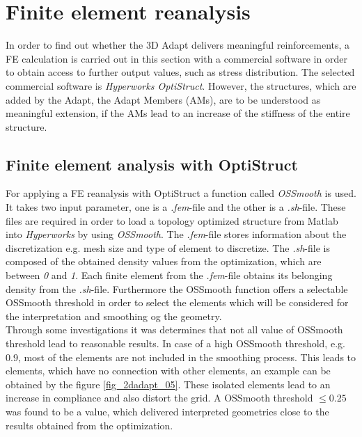 \chapter{Finite element reanalysis}
\label{chapter_fea_reanalysis}
In order to find out whether the 3D Adapt delivers
 meaningful reinforcements, a FE calculation is carried out
 in this section with 
a commercial software in order to obtain
access to further output values,
such as stress distribution. The selected commercial  
software is \emph{Hyperworks OptiStruct}.
However, the structures, which are added by the Adapt, the Adapt Members (AMs),
are to be understood as meaningful extension, if the AMs
lead to an increase of the stiffness of the entire structure. 
 
\section{Finite element analysis with OptiStruct}
For applying a FE reanalysis with OptiStruct 
 a function called \emph{OSSmooth} is used. 
 It takes two input parameter,
 one is a 
 \emph{.fem}-file and the other is a \emph{.sh}-file.
These files are required in order to load a topology
optimized structure from Matlab into \emph{Hyperworks} by
using \emph{OSSmooth}.
 The \emph{.fem}-file stores information 
 about the discretization e.g. mesh size and type of element to discretize.
 The \emph{.sh}-file is composed of
 the obtained density
 values from the optimization,
 which are between \emph{0} and \emph{1}.
 Each finite element from the \emph{.fem}-file obtains its belonging  density from the \emph{.sh}-file. 
  Furthermore the OSSmooth function offers a selectable OSSmooth threshold
  in order to select the elements which will be considered
  for the interpretation and smoothing og the geometry.\\
 
 Through some investigations it was
 determines that not all value of OSSmooth threshold lead to reasonable results.
 In case of a 
 high OSSmooth threshold, e.g. 0.9, most of the elements 
 are not included in the smoothing process. 
  This leads to elements, which have no connection with other elements, an example can be
  obtained by the figure \ref{fig_2dadapt_05}. 
  These isolated elements lead to an increase in compliance and also distort the grid.
  A OSSmooth threshold $\leq 0.25$ was found to be
  a value, which delivered interpreted geometries
  close to the results obtained from the optimization.\\
  

